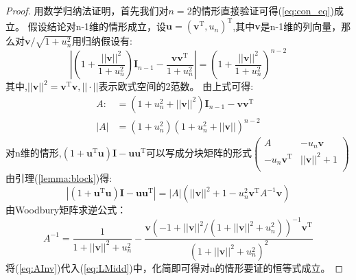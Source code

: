 \begin{proof}
用数学归纳法证明，首先我们对$n=2$的情形直接验证可得(\ref{eq:con_eq})成立。
假设结论对n-1维的情形成立，设$\bm{u}=(\bm{v}^{\textrm{T}} ,u_n)^{\textrm{T}} $,其中$\bm{v}$是n-1维的列向量，那么对$\bm{v}/\sqrt{1+u_n^2}$用归纳假设有:
\begin{equation}
|(1+\frac{||\bm{v}||^2}{1+u_n^2})\bm{I}_{n-1}-\frac{\bm{v}\bm{v}^{\textrm{T}} }{1+u_n^2}|=(1+\frac{||\bm{v}||^2}{1+u_n^2})^{n-2}
\end{equation}
其中,$||\bm{v}||^2=\bm{v}^{\textrm{T}} \bm{v},||\cdot||$表示欧式空间的2范数。
由上式可得:
\begin{align*}
A:&=(1+u_n^2+||\bm{v}||^2)\bm{I}_{n-1}-\bm{v}\bm{v}^{\textrm{T}}\\
|A|&=(1+u_n^2)(1+u_n^2+||\bm{v}||)^{n-2}
\end{align*}
对n维的情形,$(1+\bm{u}^{\textrm{T}} \bm{u})\bm{I}-\bm{u}\bm{u}^{\textrm{T}} $可以写成分块矩阵的形式$\left(\begin{array}{cc}
A&-u_n\bm{v}\\
-u_n\bm{v}^{\textrm{T}} &||\bm{v}||^2+1\\
\end{array}\right)$
由引理(\ref{lemma:block})得:
\begin{equation}\label{eq:LMidd}
|(1+\bm{u}^{\textrm{T}} \bm{u})\bm{I}-\bm{u}\bm{u}^{\textrm{T}} |=|A|(||\bm{v}||^2+1-u_n^2 \bm{v}^{\textrm{T}} A^{-1}\bm{v})
\end{equation}
由Woodbury矩阵求逆公式：
\begin{equation}\label{eq:AInv}
A^{-1}=\frac{1}{1+||\bm{v}||^2+u_n^2}-\frac{\bm{v}(-1+||\bm{v}||^2/(1+||\bm{v}||^2+u_n^2))^{-1}\bm{v}^{\textrm{T}} }{(1+||\bm{v}||^2+u_n^2)^2}
\end{equation}
将(\ref{eq:AInv})代入(\ref{eq:LMidd})中，化简即可得对n的情形要证的恒等式成立。
\end{proof}
